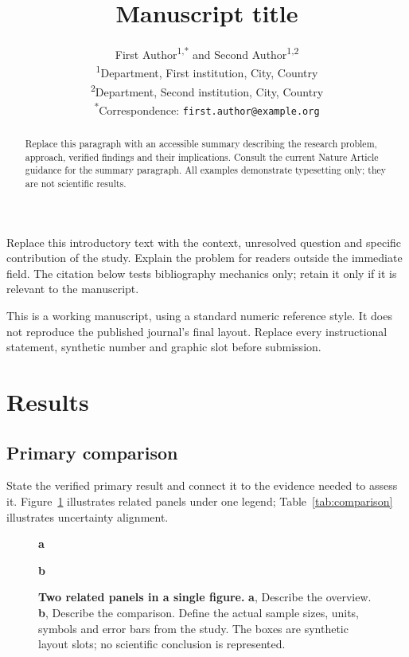 \documentclass[11pt]{article}
\title{Manuscript title}
\author{First Author\textsuperscript{1,*} and Second Author\textsuperscript{1,2}\\
  \small \textsuperscript{1}Department, First institution, City, Country\\
  \small \textsuperscript{2}Department, Second institution, City, Country\\
  \small \textsuperscript{*}Correspondence: \texttt{first.author@example.org}}
\date{}
\begin{document}
\maketitle
\begin{abstract}
Replace this paragraph with an accessible summary describing the research
problem, approach, verified findings and their implications. Consult the
current Nature Article guidance for the summary paragraph.
All examples demonstrate typesetting only; they are not scientific results.
\end{abstract}

Replace this introductory text with the context, unresolved question and
specific contribution of the study. Explain the problem for readers outside
the immediate field. The citation below tests bibliography mechanics only;
retain it only if it is relevant to the manuscript\cite{wilkinson2016fair}.

This is a working manuscript, using a standard numeric reference style.
It does not reproduce the published journal's final layout. Replace every
instructional statement, synthetic number and graphic slot before submission.

\section{Results}\label{sec:results}
\subsection{Primary comparison}
State the verified primary result and connect it to the evidence needed to
assess it. Figure~\ref{fig:comparison} illustrates related panels under one
legend; Table~\ref{tab:comparison} illustrates uncertainty alignment.

\begin{figure}[htbp]
\centering
\begin{minipage}[t]{0.47\linewidth}
\raggedright\textbf{a}\par\smallskip
{}
\end{minipage}\hfill
\begin{minipage}[t]{0.47\linewidth}
\raggedright\textbf{b}\par\smallskip
{}
\end{minipage}
\caption{\textbf{Two related panels in a single figure.} \textbf{a}, Describe
the overview. \textbf{b}, Describe the comparison. Define the actual sample
sizes, units, symbols and error bars from the study. The boxes are synthetic
layout slots; no scientific conclusion is represented.}
\label{fig:comparison}
\end{figure}
\end{document}
